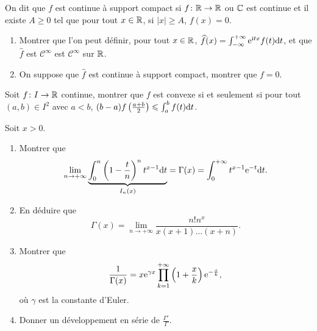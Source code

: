 \documentclass[12pt]{article}
\begin{document}
\begin{exercise}
    On dit que $f$ est continue à support compact si $f\colon\mathbb{R}\to\mathbb{R}$ ou $\mathbb{C}$ est continue et il existe $A\geqslant0$ tel que pour tout $x\in\mathbb{R}$, si $\left\lvert x\right\rvert\geqslant A$, $f(x)=0$.
    \begin{enumerate}
        \item Montrer que l'on peut définir, pour tout $x\in\mathbb{R}$, $\widehat{f}(x)=\int_{-\infty}^{+\infty}\mathrm{e}^{\mathrm{i} tx}f(t)\mathrm{d} t$, et que $\widehat{f}$ est $\mathcal{C}^{\infty}$ est $\mathcal{C}^{\infty}$ sur $\mathbb{R}$.
        \item On suppose que $\widehat{f}$ est continue à support compact, montrer que $f=0$.
    \end{enumerate}
\end{exercise}

\begin{exercise}
    Soit $f\colon I\to\mathbb{R}$ continue, montrer que $f$ est convexe si et seulement si pour tout $(a,b)\in I^{2}$ avec $a<b$, $(b-a)f\left(\frac{a+b}{2}\right)\leqslant\int_{a}^{b}f(t)\mathrm{d} t$.
\end{exercise}

\begin{exercise}
    Soit $x>0$.
    \begin{enumerate}
        \item Montrer que 
        \begin{equation}
            \lim\limits_{n\to+\infty}\underbrace{\int_{0}^{n}\left(1-\frac{t}{n}\right)^{n}t^{x-1}\mathrm{d} t}_{I_n(x)}=\Gamma(x)=\int_{0}^{+\infty}t^{x-1}\mathrm{e}^{-t}\mathrm{d} t.
        \end{equation}
        \item En déduire que 
        \begin{equation}
            \Gamma(x)=\lim\limits_{n\to+\infty}\frac{n!n^{x}}{x(x+1)\dots(x+n)}.
        \end{equation}
        \item Montrer que 
        \begin{equation}
            \frac{1}{\Gamma(x)}=x\mathrm{e}^{\gamma x}\prod_{k=1}^{+\infty}\left(1+\frac{x}{k}\right)\mathrm{e}^{-\frac{x}{k}},
        \end{equation}
        où $\gamma$ est la constante d'Euler.
        \item Donner un développement en série de $\frac{\Gamma'}{\Gamma}$.
    \end{enumerate}
\end{exercise}
\end{document}
